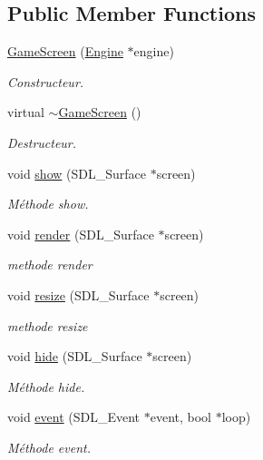 \subsection*{Public Member Functions}
\begin{DoxyCompactItemize}
\item 
\hyperlink{classGameScreen_ae8cfcd6a8b7a66d71b93ff67aae97548}{Game\-Screen} (\hyperlink{classEngine}{Engine} $\ast$engine)
\begin{DoxyCompactList}\small\item\em Constructeur. \end{DoxyCompactList}\item 
virtual \hyperlink{classGameScreen_a6e5c5a19486f4f74086e976d80f3fa14}{$\sim$\-Game\-Screen} ()
\begin{DoxyCompactList}\small\item\em Destructeur. \end{DoxyCompactList}\item 
void \hyperlink{classGameScreen_a43a2a1a9c28f8e2892ae3d91e1dcfa1f}{show} (S\-D\-L\-\_\-\-Surface $\ast$screen)
\begin{DoxyCompactList}\small\item\em Méthode show. \end{DoxyCompactList}\item 
void \hyperlink{classGameScreen_a8f4d95f64f07e01b4ebe35b31b39acb7}{render} (S\-D\-L\-\_\-\-Surface $\ast$screen)
\begin{DoxyCompactList}\small\item\em methode render \end{DoxyCompactList}\item 
void \hyperlink{classGameScreen_a0b4bad004b986f9aeed9b8f69606c11b}{resize} (S\-D\-L\-\_\-\-Surface $\ast$screen)
\begin{DoxyCompactList}\small\item\em methode resize \end{DoxyCompactList}\item 
void \hyperlink{classGameScreen_ac818a2dc8c094fc2bb23ceb0a0a53cf3}{hide} (S\-D\-L\-\_\-\-Surface $\ast$screen)
\begin{DoxyCompactList}\small\item\em Méthode hide. \end{DoxyCompactList}\item 
void \hyperlink{classGameScreen_a542fcc8ed203427ea442bb2f52406a91}{event} (S\-D\-L\-\_\-\-Event $\ast$event, bool $\ast$loop)
\begin{DoxyCompactList}\small\item\em Méthode event. \end{DoxyCompactList}\item 

\end{DoxyCompactItemize}
